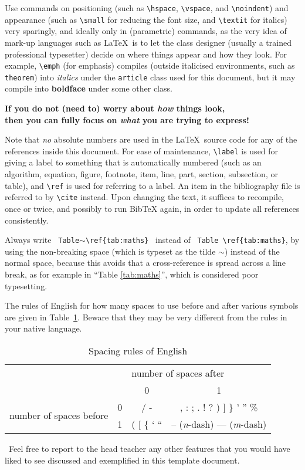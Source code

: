 Use commands on positioning (such as \verb|\hspace|, \verb|\vspace|,
and \verb|\noindent|) and appearance (such as \verb|\small| for
reducing the font size, and \verb|\textit| for italics) very
sparingly, and ideally only in (parametric) commands, as the very idea
of mark-up languages such as \LaTeX\ is to let the class designer
(usually a trained professional typesetter) decide on where things
appear and how they look.  For example, \verb|\emph| (for emphasis)
compiles (outside italicised environments, such as \texttt{theorem})
into \textit{italics} under the \texttt{article} class used for this
document, but it may compile into \textbf{boldface} under some other
class.
\begin{center}
  \textbf{If you do not (need to) worry about \emph{how} things look, \\
    then you can fully focus on \emph{what} you are trying to
    express!}
\end{center}

Note that \emph{no} absolute numbers are used in the \LaTeX\ source
code for any of the references inside this document.  For ease of
maintenance, \verb|\label| is used for giving a label to something
that is automatically numbered (such as an algorithm, equation,
figure, footnote, item, line, part, section, subsection, or table),
and \verb|\ref| is used for referring to a label.  An item in the
bibliography file is referred to by \verb|\cite| instead.  Upon
changing the text, it suffices to recompile, once or twice, and
possibly to run BibTeX again, in order to update all references
consistently.

Always write
%
\verb| Table|$\sim$\verb|\ref{tab:maths} |
%
instead of
%
\verb| Table \ref{tab:maths}|,
%
by using the non-breaking space (which is typeset as the tilde $\sim$)
instead of the normal space, because this avoids that a
cross-reference is spread across a line break, as for example in
``Table \ref{tab:maths}'', which is considered poor typesetting.

The rules of English for how many spaces to use before and after
various symbols are given in Table~\ref{tab:spacing}.  Beware that
they may be very different from the rules in your native language.

\begin{table}[t]
  \centering
  \begin{tabular}{cc|c|c}
    \toprule
    \multicolumn{2}{c}{} & \multicolumn{2}{l}{number of spaces after} \\
    \cmidrule{3-4}
    \multicolumn{2}{c}{} & 0 & 1 \\
    \midrule
    \multirow{2}{*}{number of spaces before} & 0 & / - & , : ; . ! ?
    ) ] \} ' '' \% \\
    \cmidrule{2-4}
    & 1 & ( [ \{ ` `` & -- (\emph{n}-dash) --- (\emph{m}-dash) \\
    \bottomrule
  \end{tabular}
  \caption{Spacing rules of English}
  \label{tab:spacing}
\end{table}

\vfill

\noindent
\handpoint\ Feel free to report to the head teacher any other features
that you would have liked to see discussed and exemplified in this
template document.

